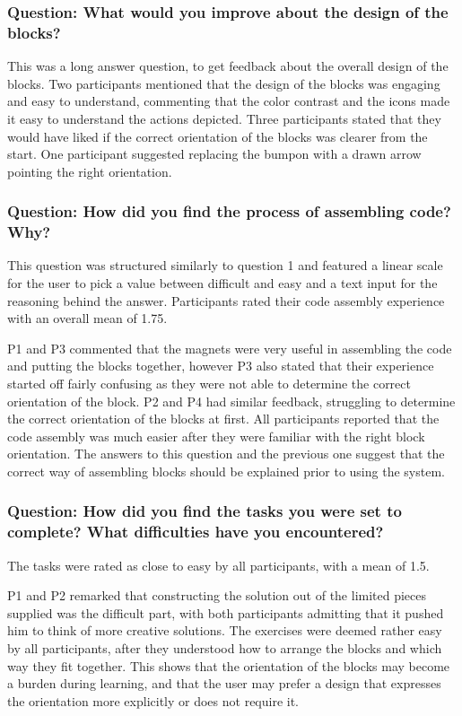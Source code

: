 \documentclass[oneside,%
                    author={Malak Hajji},
                    degree={BSc},
                    title={Designing An Accessible Ozobot Programming Platform for Students},
                  subtitle={With Mixed Visual Abilities}]{dissertation}
\begin{document}
\subsubsection{Question: What would you improve about the design of the blocks?}
This was a long answer question, to get feedback about the overall design of the blocks.
Two participants mentioned that the design of the blocks was engaging and easy to understand, commenting that the color contrast and the icons made it easy to understand the actions depicted. Three participants stated that they would have liked if the correct orientation of the blocks was clearer from the start. One participant suggested replacing the bumpon with a drawn arrow pointing the right orientation. 

\subsubsection{Question: How did you find the process of assembling code? Why?}
This question was structured similarly to question 1 and featured a linear scale for the user to pick a value between difficult and easy and a text input for the reasoning behind the answer. Participants rated their code assembly experience with an overall mean of 1.75.

P1 and P3 commented that the magnets were very useful in assembling the code and putting the blocks together, however P3 also stated that their experience started off fairly confusing as they were not able to determine the correct orientation of the block. P2 and P4 had similar feedback, struggling to determine the correct orientation of the blocks at first.  All participants reported that the code assembly was much easier after they were familiar with the right block orientation. The answers to this question and the previous one suggest that the correct way of assembling blocks should be explained prior to using the system.

\subsubsection{Question: How did you find the tasks you were set to complete? What difficulties have you encountered?}
The tasks were rated as close to easy by all participants, with a mean of 1.5. 

P1 and P2 remarked that constructing the solution out of the limited pieces supplied was the difficult part, with both participants admitting that it pushed him to think of more creative solutions. The exercises were deemed rather easy by all participants, after they understood how to arrange the blocks and which way they fit together. This shows that the orientation of the blocks may become a burden during learning, and that the user may prefer a design that expresses the orientation more explicitly or does not require it. 
\end{document}
